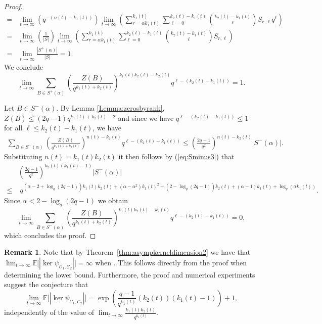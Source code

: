 \documentclass[a4paper,11pt,reqno]{article}
\newcommand{\C}{\mathcal{C}}
\theoremstyle{plain} \numberwithin{equation}{section}
\theoremstyle{definition}
\newtheorem{remark}[theorem]{Remark}
\begin{document}
\begin{proof}
\begin{align*}
=& \lim_{t\rightarrow \infty } \left(q^{-(n(t)-k_1(t))}\right) \lim_{t\rightarrow \infty} \left(\sum_{r=\alpha k_1(t)}^{k_1(t)}\sum_{\ell = 0}^{k_2(t)-k_1(t)} \binom{k_2(t)-k_1(t)}{\ell} S_{r,\ell}q^{\ell}\right) \\ 
=& \lim_{t\rightarrow \infty } \left(\frac{1}{|S|}\right) \lim_{t\rightarrow \infty}\left(\sum_{r=\alpha k_1(t)}^{k_1(t)}\sum_{\ell = 0}^{k_2(t)-k_1(t)} \binom{k_2(t)-k_1(t)}{\ell} S_{r,\ell}\right)\\
=&\lim_{t\rightarrow \infty} \frac{|S^+(\alpha)|}{|S|} =1.
\end{align*}
We conclude
\[\lim_{t\rightarrow \infty}\sum_{B\in S^+(\alpha)} \left( \frac{Z(B)}{q^{k_1(t)+k_2(t)}} \right)^{k_1(t)k_2(t)-k_2(t)}q^{\ell - (k_2(t)-k_1(t))}=1.
\]


Let $B\in S^-(\alpha)$. By Lemma \ref{Lemma:zerosbyrank}, $Z(B) \leq (2q-1)q^{k_1(t)+k_2(t)-2}$ and since we have $q^{\ell-(k_2(t)-k_1(t))}\leq 1$ for all $\ell \leq k_2(t)-k_1(t)$, we have
\begin{align*}
    \sum_{B\in S^-(\alpha)}\left(\frac{Z(B)}{q^{k_1(t)+k_2(t)}}\right)^{n(t)-k_2(t)}q^{\ell-(k_2(t)-k_1(t))} \leq \left(\frac{2q-1}{q^2}\right)^{n(t)-k_2(t)} |S^-(\alpha)|.
\end{align*}
Substituting $n(t)=k_1(t)k_2(t)$ it then follows by (\ref{eq:Sminus3}) that
\begin{align*}
    &\left(\frac{2q-1}{q^2}\right)^{k_2(t)(k_1(t)-1)} |S^-(\alpha)| \\
    \leq&\; q^{(\alpha - 2 + \log_q(2q-1))k_1(t)k_2(t) + (\alpha-\alpha^2)k_1(t)^2 + (2-\log_q(2q-1))k_2(t) + (\alpha-1)k_1(t) + \log_q(\alpha k_1(t))}.
\end{align*}
Since $\alpha<2-\log_q(2q-1)$ we obtain
\[
\lim_{t\rightarrow \infty}\sum_{B\in S^-(\alpha)}\left(\frac{Z(B)}{q^{k_1(t)+k_2(t)}}\right)^{k_1(t) k_2(t)-k_2(t)}q^{\ell-(k_2(t)-k_1(t))} =0,
\]
which concludes the proof.
\end{proof}


\begin{remark}
Note that by Theorem~\ref{thm:asympkerneldimension2} we have that $\lim_{t\rightarrow \infty} \mathbb{E}\big[|\ker \psi_{\C_1,\C_2}|\big]=\infty$ when . This follows directly from the proof when determining the lower bound. Furthermore, the proof and numerical experiments suggest the conjecture that $$\lim_{t\rightarrow \infty} \mathbb{E}\big[|\ker \psi_{\C_1,\C_2}|\big]= \exp\left(\frac{q-1}{q^{k_1(t)}}(k_2(t))(k_1(t)-1)\right)+1,$$ independently of the value of $\lim_{t\rightarrow \infty} \frac{k_1(t)k_2(t)}{q^{k_1(t)}}$.
\end{remark}
\end{document}
